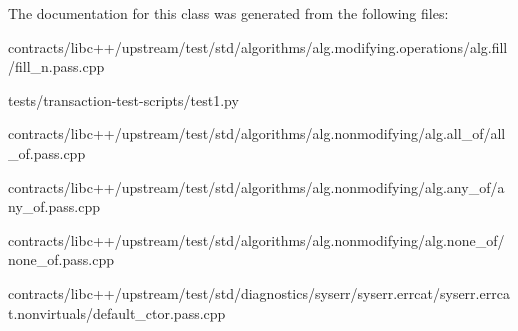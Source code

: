 The documentation for this class was generated from the following files\+:\begin{DoxyCompactItemize}
\item 
contracts/libc++/upstream/test/std/algorithms/alg.\+modifying.\+operations/alg.\+fill/fill\+\_\+n.\+pass.\+cpp\item 
tests/transaction-\/test-\/scripts/test1.\+py\item 
contracts/libc++/upstream/test/std/algorithms/alg.\+nonmodifying/alg.\+all\+\_\+of/all\+\_\+of.\+pass.\+cpp\item 
contracts/libc++/upstream/test/std/algorithms/alg.\+nonmodifying/alg.\+any\+\_\+of/any\+\_\+of.\+pass.\+cpp\item 
contracts/libc++/upstream/test/std/algorithms/alg.\+nonmodifying/alg.\+none\+\_\+of/none\+\_\+of.\+pass.\+cpp\item 
contracts/libc++/upstream/test/std/diagnostics/syserr/syserr.\+errcat/syserr.\+errcat.\+nonvirtuals/default\+\_\+ctor.\+pass.\+cpp\end{DoxyCompactItemize}
